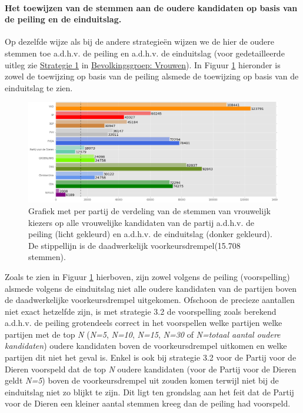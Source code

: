 \paragraph{Het toewijzen van de stemmen aan de oudere kandidaten op basis van de peiling en de einduitslag.}
Op dezelfde wijze als bij de andere strategie\"{e}n wijzen we de hier de oudere stemmen toe a.d.h.v. de peiling en a.d.h.v. de einduitslag (voor gedetailleerde uitleg zie \hyperref[S1V]{Strategie 1} in \hyperref[vrouwen]{Bevolkingsgroep: Vrouwen}). In Figuur \ref{fig:stemmenS32O} hieronder is zowel de toewijzing op basis van de peiling alsmede de toewijzing op basis van de einduitslag te zien.


\begin{figure}[H]

	\includegraphics[width=\linewidth]{stemmen_op_ouderen_eigenX_samen.png}

			\caption{Grafiek met per partij de verdeling van de stemmen van vrouwelijk kiezers op alle vrouwelijke kandidaten van de partij a.d.h.v. de peiling (licht gekleurd) en a.d.h.v. de einduitslag (donker gekleurd). De stippellijn is de daadwerkelijk voorkeursdrempel(15.708 stemmen).}

\label{fig:stemmenS32O}
\end{figure}

Zoals te zien in Figuur \ref{fig:stemmenS32O} hierboven, zijn zowel volgens de peiling (voorspelling) alsmede volgens de einduitslag niet alle oudere kandidaten van de partijen boven de daadwerkelijke voorkeursdrempel uitgekomen. Ofschoon de precieze aantallen niet exact hetzelfde zijn, is met strategie 3.2 de voorspelling zoals berekend a.d.h.v. de peiling grotendeels correct in het voorspellen welke partijen welke partijen met de top \textit{N} (\textit{N=5}, \textit{N=10}, \textit{N=15}, \textit{N=30} of \textit{N=totaal aantal oudere kandidaten}) oudere kandidaten boven de voorkeursdrempel uitkomen en welke partijen dit niet het geval is. Enkel is ook bij strategie 3.2 voor de Partij voor de Dieren voorspeld dat de top \textit{N} oudere kandidaten (voor de Partij voor de Dieren geldt \textit{N=5}) boven de voorkeursdrempel uit zouden komen terwijl niet bij de einduitslag niet zo blijkt te zijn.  Dit ligt ten grondslag aan het feit dat de Partij voor de Dieren een kleiner aantal stemmen kreeg dan de peiling had voorspeld. 


